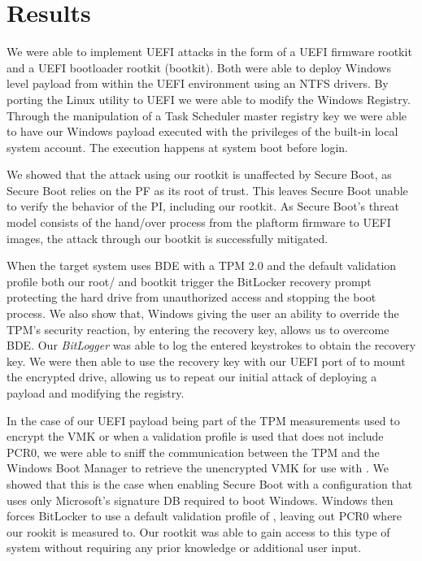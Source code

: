 
\chapter{Results}
\label{sec:results}

We were able to implement \ac{UEFI} attacks in the form of a \ac{UEFI} firmware rootkit and a \ac{UEFI} bootloader rootkit (bootkit).
Both were able to deploy Windows level payload from within the \ac{UEFI} environment using an \ac{NTFS} drivers.
By porting the Linux utility  to \ac{UEFI} we were able to modify the Windows Registry.
Through the manipulation of a Task Scheduler master registry key we were able to have our Windows payload executed with the privileges of the built-in local system account.
The execution happens at system boot before login.

We showed that the attack using our rootkit is unaffected by Secure Boot, as Secure Boot relies on the \ac{PF} as its root of trust.
This leaves Secure Boot unable to verify the behavior of the \ac{PI}, including our rootkit.
As Secure Boot's threat model consists of the hand\-/over process from the plaftorm firmware to \ac{UEFI} images, the attack through our bootkit is successfully mitigated.

When the target system uses \ac{BDE} with a \ac{TPM} 2.0 and the default validation profile \hyperref[tab:pcr-usage]{} both our root\-/ and bootkit trigger the BitLocker recovery prompt protecting the hard drive from unauthorized access and stopping the boot process.
We also show that, Windows giving the user an ability to override the \ac{TPM}'s security reaction, by entering the recovery key, allows us to overcome \ac{BDE}.
Our \emph{BitLogger} was able to log the entered keystrokes to obtain the recovery key.
We were then able to use the recovery key with our \ac{UEFI} port of  to mount the encrypted drive, allowing us to repeat our initial attack of deploying a payload and modifying the registry.

In the case of our \ac{UEFI} payload being part of the \ac{TPM} measurements used to encrypt the \ac{VMK} or when a validation profile is used that does not include \ac{PCR}0, we were able to sniff the communication between the \ac{TPM} and the Windows Boot Manager to retrieve the unencrypted \ac{VMK} for use with .
We showed that this is the case when enabling Secure Boot with a configuration that uses only Microsoft's signature \ac{DB} required to boot Windows.
Windows then forces BitLocker to use a default validation profile of \hyperref[tab:pcr-usage]{}, leaving out \ac{PCR}0 where our rookit is measured to.
Our rootkit was able to gain access to this type of system without requiring any prior knowledge or additional user input.